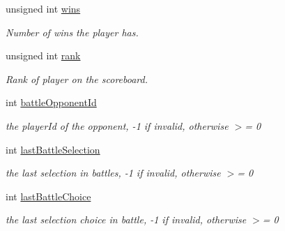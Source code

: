 \begin{DoxyCompactItemize}
\item 
\hypertarget{class_game_state_1_1_player_aac7333a06ea194848f12090be762cdd6}{unsigned int \hyperlink{class_game_state_1_1_player_aac7333a06ea194848f12090be762cdd6}{wins}}\label{class_game_state_1_1_player_aac7333a06ea194848f12090be762cdd6}

\begin{DoxyCompactList}\small\item\em Number of wins the player has. \end{DoxyCompactList}\item 
\hypertarget{class_game_state_1_1_player_a43dd8a9e79c35d9615596fb6ab25d653}{unsigned int \hyperlink{class_game_state_1_1_player_a43dd8a9e79c35d9615596fb6ab25d653}{rank}}\label{class_game_state_1_1_player_a43dd8a9e79c35d9615596fb6ab25d653}

\begin{DoxyCompactList}\small\item\em Rank of player on the scoreboard. \end{DoxyCompactList}\item 
\hypertarget{class_game_state_1_1_player_ae60a4f411ef984c6d649d98c65b274bd}{int \hyperlink{class_game_state_1_1_player_ae60a4f411ef984c6d649d98c65b274bd}{battle\-Opponent\-Id}}\label{class_game_state_1_1_player_ae60a4f411ef984c6d649d98c65b274bd}

\begin{DoxyCompactList}\small\item\em the player\-Id of the opponent, -\/1 if invalid, otherwise $>$= 0 \end{DoxyCompactList}\item 
\hypertarget{class_game_state_1_1_player_a2383ab7d3783c5122f3e68230069eb2e}{int \hyperlink{class_game_state_1_1_player_a2383ab7d3783c5122f3e68230069eb2e}{last\-Battle\-Selection}}\label{class_game_state_1_1_player_a2383ab7d3783c5122f3e68230069eb2e}

\begin{DoxyCompactList}\small\item\em the last selection in battles, -\/1 if invalid, otherwise $>$= 0 \end{DoxyCompactList}\item 
\hypertarget{class_game_state_1_1_player_adf61e3258c2170b7b66355389cca541f}{int \hyperlink{class_game_state_1_1_player_adf61e3258c2170b7b66355389cca541f}{last\-Battle\-Choice}}\label{class_game_state_1_1_player_adf61e3258c2170b7b66355389cca541f}

\begin{DoxyCompactList}\small\item\em the last selection choice in battle, -\/1 if invalid, otherwise $>$= 0 \end{DoxyCompactList}\end{DoxyCompactItemize}
